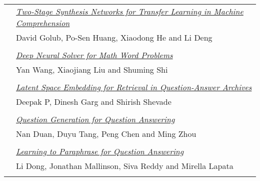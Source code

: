 \begin{tabular}{p{20mm}p{128mm}}
 & \hyperlink{page.844}{\em Two-Stage Synthesis Networks for Transfer Learning in Machine Comprehension}\\
         & David Golub, Po-Sen Huang, Xiaodong He and Li Deng \\
\\

 & \hyperlink{page.854}{\em Deep Neural Solver for Math Word Problems}\\
         & Yan Wang, Xiaojiang Liu and Shuming Shi \\
\\

 & \hyperlink{page.864}{\em Latent Space Embedding for Retrieval in Question-Answer Archives}\\
         & Deepak P, Dinesh Garg and Shirish Shevade \\
\\

 & \hyperlink{page.875}{\em Question Generation for Question Answering}\\
         & Nan Duan, Duyu Tang, Peng Chen and Ming Zhou \\
\\

 & \hyperlink{page.884}{\em Learning to Paraphrase for Question Answering}\\
         & Li Dong, Jonathan Mallinson, Siva Reddy and Mirella Lapata \\
\\

\end{tabular}
\newpage

